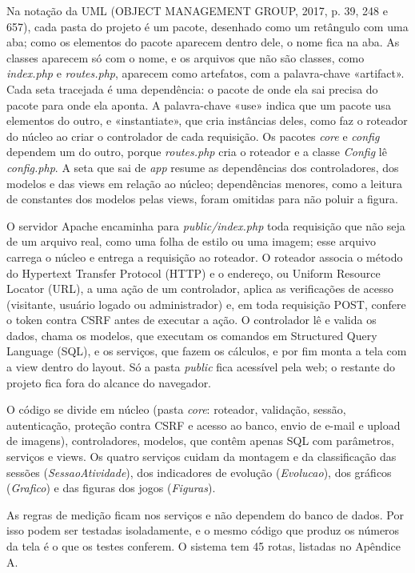 Na notação da UML (OBJECT MANAGEMENT GROUP, 2017, p. 39, 248 e 657), cada pasta do projeto é um pacote, desenhado como um retângulo com uma aba; como os elementos do pacote aparecem dentro dele, o nome fica na aba. As classes aparecem só com o nome, e os arquivos que não são classes, como \textit{index.php} e \textit{routes.php}, aparecem como artefatos, com a palavra-chave «artifact». Cada seta tracejada é uma dependência: o pacote de onde ela sai precisa do pacote para onde ela aponta. A palavra-chave «use» indica que um pacote usa elementos do outro, e «instantiate», que cria instâncias deles, como faz o roteador do núcleo ao criar o controlador de cada requisição. Os pacotes \textit{core} e \textit{config} dependem um do outro, porque \textit{routes.php} cria o roteador e a classe \textit{Config} lê \textit{config.php}. A seta que sai de \textit{app} resume as dependências dos controladores, dos modelos e das views em relação ao núcleo; dependências menores, como a leitura de constantes dos modelos pelas views, foram omitidas para não poluir a figura.

O servidor Apache encaminha para \textit{public/index.php} toda requisição que não seja de um arquivo real, como uma folha de estilo ou uma imagem; esse arquivo carrega o núcleo e entrega a requisição ao roteador. O roteador associa o método do Hypertext Transfer Protocol (HTTP) e o endereço, ou Uniform Resource Locator (URL), a uma ação de um controlador, aplica as verificações de acesso (visitante, usuário logado ou administrador) e, em toda requisição POST, confere o token contra CSRF antes de executar a ação. O controlador lê e valida os dados, chama os modelos, que executam os comandos em Structured Query Language (SQL), e os serviços, que fazem os cálculos, e por fim monta a tela com a view dentro do layout. Só a pasta \textit{public} fica acessível pela web; o restante do projeto fica fora do alcance do navegador.

O código se divide em núcleo (pasta \textit{core}: roteador, validação, sessão, autenticação, proteção contra CSRF e acesso ao banco, envio de e-mail e upload de imagens), controladores, modelos, que contêm apenas SQL com parâmetros, serviços e views. Os quatro serviços cuidam da montagem e da classificação das sessões (\textit{SessaoAtividade}), dos indicadores de evolução (\textit{Evolucao}), dos gráficos (\textit{Grafico}) e das figuras dos jogos (\textit{Figuras}).

As regras de medição ficam nos serviços e não dependem do banco de dados. Por isso podem ser testadas isoladamente, e o mesmo código que produz os números da tela é o que os testes conferem. O sistema tem 45 rotas, listadas no Apêndice A.

